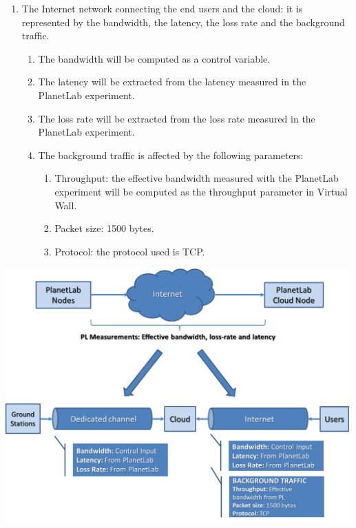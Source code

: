 \documentclass[a4paper]{article}
\newcounter{saveenum}
\newcommand\liststyleLFOvi{%
\renewcommand\theenumi{\roman{enumi}}
\renewcommand\theenumii{\alph{enumii}}
\renewcommand\theenumiii{\roman{enumiii}}
\renewcommand\theenumiv{\arabic{enumiv}}
\renewcommand\labelenumi{\theenumi)}
\renewcommand\labelenumii{\theenumii.}
\renewcommand\labelenumiii{\theenumiii.}
\renewcommand\labelenumiv{\theenumiv.}
}
\begin{document}
\liststyleLFOvi
\setcounter{saveenum}{\value{enumi}}
\begin{enumerate}
\setcounter{enumi}{\value{saveenum}}
\item The Internet network connecting the end users and the cloud: it is
represented by the bandwidth, the latency, the loss rate and the
background traffic.

\setcounter{saveenum}{\value{enumii}}
\begin{enumerate}
\setcounter{enumii}{\value{saveenum}}
\item The bandwidth will be computed as a control variable.
\item The latency will be extracted from the latency measured in the
PlanetLab experiment.
\item The loss rate will be extracted from the loss rate measured in the
PlanetLab experiment.
\item The background traffic is affected by the following parameters:

\setcounter{saveenum}{\value{enumiii}}
\begin{enumerate}
\setcounter{enumiii}{\value{saveenum}}
\item Throughput: the effective bandwidth measured with the PlanetLab
experiment will be computed as the throughput parameter in Virtual
Wall.
\item Packet size: 1500 bytes.
\item Protocol: the protocol used is TCP.
\end{enumerate}
\end{enumerate}
\end{enumerate}

\bigskip

{\centering 
\includegraphics[width=5.22037in,height=3.85406in]{ple-img3.png} \par}
\end{document}
